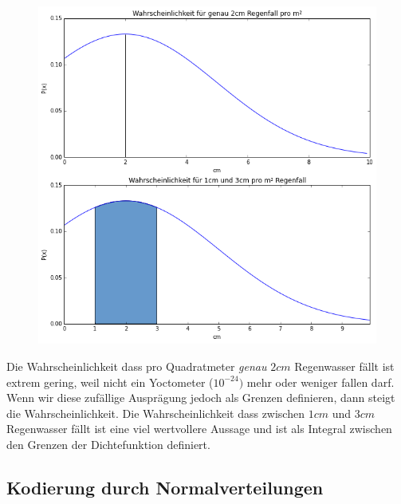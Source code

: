             \begin{figure}[H]

                    \begin{center}
                        \hspace{-1cm}
                        \includegraphics[scale=0.5]{../pictures/diagrams/rainfall-pdf.png}\\
                    \end{center}
            \end{figure}
            \noindent
            Die Wahrscheinlichkeit dass pro Quadratmeter \textit{genau} $2cm$ Regenwasser fällt ist extrem gering, weil nicht ein Yoctometer ($10^{-24})$ mehr oder weniger fallen darf. Wenn wir diese zufällige Ausprägung jedoch als Grenzen definieren, dann steigt die Wahrscheinlichkeit. Die Wahrscheinlichkeit dass zwischen $1cm$ und $3cm$ Regenwasser fällt ist eine viel wertvollere Aussage und ist als Integral zwischen den Grenzen der Dichtefunktion definiert.\\

            \subsection{Kodierung durch Normalverteilungen}

